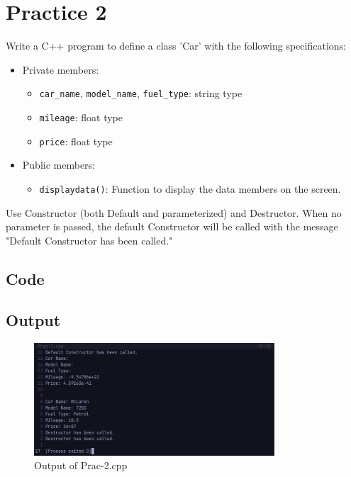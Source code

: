 \documentclass[12pt]{article}
\begin{document}
\FloatBarrier
\section*{Practice 2}
Write a C++ program to define a class 'Car' with the following specifications:
\begin{itemize}
    \item Private members:
        \begin{itemize}
            \item \texttt{car\_name}, \texttt{model\_name}, \texttt{fuel\_type}: string type 
            \item \texttt{mileage}: float type 
            \item \texttt{price}: float type
        \end{itemize}
    \item Public members:
        \begin{itemize}
            \item \texttt{displaydata()}: Function to display the data members on the screen.
        \end{itemize}
\end{itemize}
Use Constructor (both Default and parameterized) and Destructor. When no parameter is passed, the default Constructor will be called with the message "Default Constructor has been called."

\subsection*{Code}


\subsection*{Output}
\begin{figure}[htpb]
    \centering
    \includegraphics[width=0.8\textwidth]{Prac-2.png}
    \caption{Output of Prac-2.cpp}
\end{figure}
\end{document}
